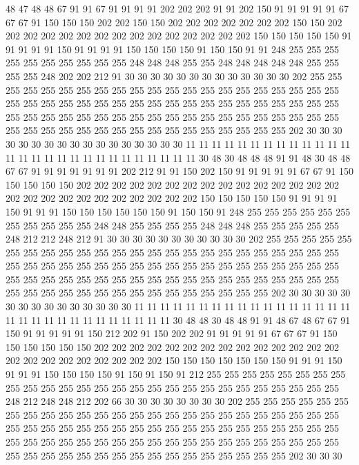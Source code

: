 48 47 48 48 67 91 91 67 91 91 91 91 202 202 202 91 91 202 150 91
91 91 91 91 67 67 67 91 150 150 150 202 202 150 150 202 202 202 202 202
202 202 150 150 202 202 202 202 202 202 202 202 202 202 202 202 202 202 202 150
150 150 150 150 91 91 91 91 91 150 91 91 91 91 150 150 150 150 91 150
150 91 91 248 255 255 255 255 255 255 255 255 255 255 248 248 248 255 255 248
248 248 248 248 255 255 255 255 248 202 202 212 91 30 30 30 30 30 30 30
30 30 30 30 30 30 202 255 255 255 255 255 255 255 255 255 255 255 255 255
255 255 255 255 255 255 255 255 255 255 255 255 255 255 255 255 255 255 255 255
255 255 255 255 255 255 255 255 255 255 255 255 255 255 255 255 255 255 255 255
255 255 255 255 255 255 255 255 255 255 255 255 255 255 255 255 255 255 255 255
255 255 202 30 30 30 30 30 30 30 30 30 30 30 30 30 30 30 30 30
11 11 11 11 11 11 11 11 11 11 11 11 11 11 11 11 11 11 11 11
11 11 11 11 11 11 11 11 30 48 30 48 48 48 91 91 48 30 48 48
67 67 91 91 91 91 91 91 91 202 212 91 91 150 202 150 91 91 91 91
91 67 67 91 150 150 150 150 150 202 202 202 202 202 202 202 202 202 202 202
202 202 202 202 202 202 202 202 202 202 202 202 202 202 202 150 150 150 150 150
91 91 91 91 150 91 91 91 150 150 150 150 150 150 91 150 150 91 248 255
255 255 255 255 255 255 255 255 255 255 248 248 255 255 255 255 248 248 248 255
255 255 255 255 248 212 212 248 212 91 30 30 30 30 30 30 30 30 30 30
30 202 255 255 255 255 255 255 255 255 255 255 255 255 255 255 255 255 255 255
255 255 255 255 255 255 255 255 255 255 255 255 255 255 255 255 255 255 255 255
255 255 255 255 255 255 255 255 255 255 255 255 255 255 255 255 255 255 255 255
255 255 255 255 255 255 255 255 255 255 255 255 255 255 255 255 255 255 255 202
30 30 30 30 30 30 30 30 30 30 30 30 30 30 30 11 11 11 11 11
11 11 11 11 11 11 11 11 11 11 11 11 11 11 11 11 11 11 11 11
11 11 11 11 11 30 48 48 30 48 48 91 91 48 67 48 67 67 91 150
91 91 91 91 91 150 212 202 91 150 202 202 91 91 91 91 91 67 67 67
91 150 150 150 150 150 150 202 202 202 202 202 202 202 202 202 202 202 202 202
202 202 202 202 202 202 202 202 202 202 150 150 150 150 150 150 150 91 91 91
150 91 91 91 150 150 150 150 91 150 91 150 91 212 255 255 255 255 255 255
255 255 255 255 255 255 255 255 255 255 255 255 255 255 255 255 255 255 255 255
255 248 212 248 248 212 202 66 30 30 30 30 30 30 30 30 202 255 255 255
255 255 255 255 255 255 255 255 255 255 255 255 255 255 255 255 255 255 255 255
255 255 255 255 255 255 255 255 255 255 255 255 255 255 255 255 255 255 255 255
255 255 255 255 255 255 255 255 255 255 255 255 255 255 255 255 255 255 255 255
255 255 255 255 255 255 255 255 255 255 255 255 255 255 255 255 202 30 30 30
